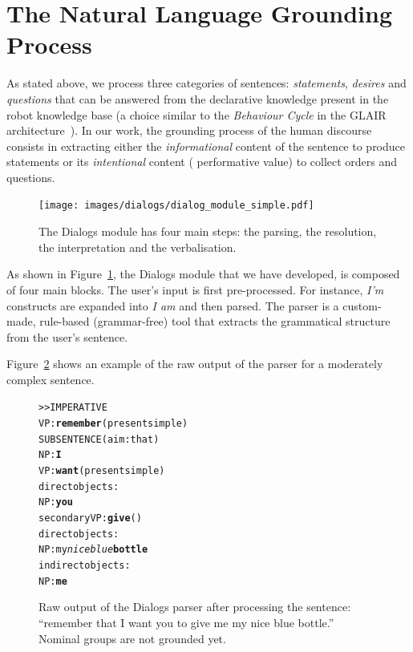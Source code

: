\section{The Natural Language Grounding Process}
\label{dialog}

As stated above, we process three categories of
sentences: \emph{statements}, \emph{desires} and \emph{questions} that can be
answered from the declarative knowledge present in the robot knowledge base (a
choice similar to the \emph{Behaviour Cycle} in the GLAIR
architecture~\cite{Shapiro2009}). In our work, the grounding process of the
human discourse consists in extracting either the \emph{informational} content
of the sentence to produce statements or its \emph{intentional} content (\ie
performative value) to collect orders and questions.

\begin{figure}[!ht]
\centering
  \texttt{[image: images/dialogs/dialog\_module\_simple.pdf]}

  \caption{The {\sc Dialogs} module has four main steps: the parsing, the
  resolution, the interpretation and the verbalisation.}

  \label{fig|dialog}
\end{figure}

As shown in Figure~\ref{fig|dialog}, the {\sc Dialogs} module that we have
developed, is composed of four main blocks. The user's input is first
pre-processed. For instance, \emph{I'm} constructs are expanded into \emph{I
am} and then parsed. The parser is a custom-made, rule-based (\ie grammar-free)
tool that extracts the grammatical structure from the user's sentence.

Figure~\ref{dialog|parser_output} shows an example of the raw output of the
parser for a moderately complex sentence.

\begin{figure}%
\centering
\scriptsize
\begin{alltt}
>> IMPERATIVE
VP: \textbf{remember} (present simple)
    SUBSENTENCE (aim: that)
      NP: \textbf{I}
      VP: \textbf{want} (present simple)
        direct objects: 
          NP: \textbf{you}
        secondary VP: \textbf{give} ()
              direct objects:
                NP: my \emph{nice blue} \textbf{bottle}
              indirect objects:
                NP: \textbf{me}
\end{alltt}
\caption{Raw output of the {\sc Dialogs} parser after processing the
sentence: ``remember that I want you to give me my nice blue bottle.'' 
Nominal groups are not grounded yet.} 
\label{dialog|parser_output}
\end{figure}

